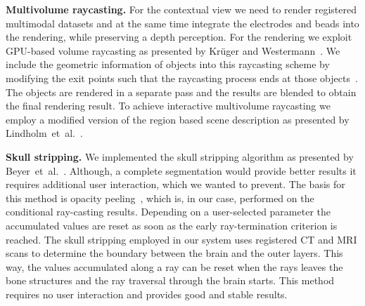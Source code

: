 \documentclass{vgtc}                          %
\begin{document}
\noindent \textbf{Multivolume raycasting.} For the contextual view we need to render registered multimodal datasets and at the same time integrate the electrodes and beads into the rendering, while preserving a depth perception. For the rendering we exploit GPU-based volume raycasting as presented by Kr\"uger and Westermann~\cite{kr}. We include the geometric information of objects into this raycasting scheme by modifying the exit points such that the raycasting process ends at those objects~\cite{Scharsach}. The objects are rendered in a separate pass and the results are blended to obtain the final rendering result. To achieve interactive multivolume raycasting we employ a modified version of the region based scene description as presented by Lindholm~et~al.~\cite{Lindholm2009}.

\noindent \textbf{Skull stripping.} We implemented the skull stripping algorithm as presented by Beyer~et~al.~\cite{Beyer2007}. Although, a complete segmentation would provide better results it requires additional user interaction, which we wanted to prevent. The basis for this method is opacity peeling~\cite{Rezk-salama2006}, which is, in our case, performed on the conditional ray-casting results. Depending on a user-selected parameter the accumulated values are reset as soon as the early ray-termination criterion is reached. The skull stripping employed in our system uses registered CT and MRI scans to determine the boundary between the brain and the outer layers. This way, the values accumulated along a ray can be reset when the rays leaves the bone structures and the ray traversal through the brain starts. This method requires no user interaction and provides good and stable results.

\end{document}

